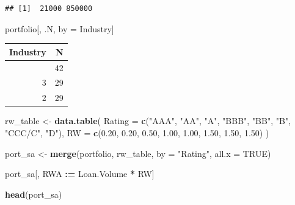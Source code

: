 \documentclass[
  11pt,
]{article}
\newenvironment{Shaded}{\begin{snugshade}}{\end{snugshade}}
\newcommand{\AttributeTok}[1]{\textcolor[rgb]{0.13,0.29,0.53}{#1}}
\newcommand{\ConstantTok}[1]{\textcolor[rgb]{0.56,0.35,0.01}{#1}}
\newcommand{\FloatTok}[1]{\textcolor[rgb]{0.00,0.00,0.81}{#1}}
\newcommand{\FunctionTok}[1]{\textcolor[rgb]{0.13,0.29,0.53}{\textbf{#1}}}
\newcommand{\NormalTok}[1]{#1}
\newcommand{\OtherTok}[1]{\textcolor[rgb]{0.56,0.35,0.01}{#1}}
\newcommand{\SpecialCharTok}[1]{\textcolor[rgb]{0.81,0.36,0.00}{\textbf{#1}}}
\newcommand{\StringTok}[1]{\textcolor[rgb]{0.31,0.60,0.02}{#1}}
\newcounter{none} %
\begin{document}
\begin{Shaded}
\end{Shaded}

\begin{verbatim}
## [1]  21000 850000
\end{verbatim}

\begin{Shaded}
\begin{Highlighting}[]
\NormalTok{portfolio[, .N, by }\OtherTok{=}\NormalTok{ Industry]}
\end{Highlighting}
\end{Shaded}

{\def\LTcaptype{none} %
\begin{longtable}[]{@{}rr@{}}
\toprule\noalign{}
Industry & N \\
\midrule\noalign{}
\endhead
\bottomrule\noalign{}
\endlastfoot
1 & 42 \\
3 & 29 \\
2 & 29 \\
\end{longtable}
}

\begin{Shaded}
\begin{Highlighting}[]
\NormalTok{rw\_table }\OtherTok{\textless{}{-}} \FunctionTok{data.table}\NormalTok{(}
    \AttributeTok{Rating =} \FunctionTok{c}\NormalTok{(}\StringTok{"AAA"}\NormalTok{, }\StringTok{"AA"}\NormalTok{, }\StringTok{"A"}\NormalTok{, }\StringTok{"BBB"}\NormalTok{, }\StringTok{"BB"}\NormalTok{, }\StringTok{"B"}\NormalTok{, }\StringTok{"CCC/C"}\NormalTok{, }\StringTok{"D"}\NormalTok{),}
    \AttributeTok{RW =} \FunctionTok{c}\NormalTok{(}\FloatTok{0.20}\NormalTok{, }\FloatTok{0.20}\NormalTok{, }\FloatTok{0.50}\NormalTok{, }\FloatTok{1.00}\NormalTok{, }\FloatTok{1.00}\NormalTok{, }\FloatTok{1.50}\NormalTok{, }\FloatTok{1.50}\NormalTok{, }\FloatTok{1.50}\NormalTok{)}
\NormalTok{)}

\NormalTok{port\_sa }\OtherTok{\textless{}{-}} \FunctionTok{merge}\NormalTok{(portfolio, rw\_table, }\AttributeTok{by =} \StringTok{"Rating"}\NormalTok{, }\AttributeTok{all.x =} \ConstantTok{TRUE}\NormalTok{)}

\NormalTok{port\_sa[, RWA }\SpecialCharTok{:=}\NormalTok{ Loan.Volume }\SpecialCharTok{*}\NormalTok{ RW]}

\FunctionTok{head}\NormalTok{(port\_sa)}
\end{Highlighting}
\end{Shaded}
\end{document}
